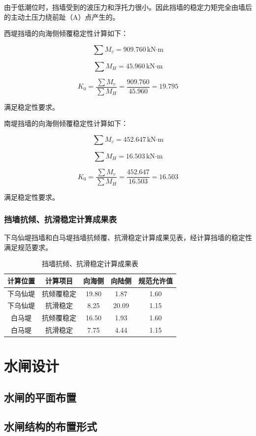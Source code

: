 \documentclass[UTF8, a4paper, 12pt]{ctexart} %
\begin{document}
由于低潮位时，挡墙受到的波压力和浮托力很小。因此挡墙的稳定力矩完全由墙后的主动土压力绕前趾（A）点产生的。

西堤挡墙的向海侧倾覆稳定性计算如下：

\[
\sum M_v = 909.760\,\text{kN·m}
\]

\[
\sum M_H = 45.960\,\text{kN·m}
\]

\[
K_0 = \frac{\sum M_v}{\sum M_H} = \frac{909.760}{45.960} = 19.795
\]

满足稳定性要求。

南堤挡墙的向海侧倾覆稳定性计算如下：

\[
\sum M_v = 452.647\,\text{kN·m}
\]

\[
\sum M_H = 16.503\,\text{kN·m}
\]

\[
K_0 = \frac{\sum M_v}{\sum M_H} = \frac{452.647}{16.503} = 16.503
\]

满足稳定性要求。
\subsubsection{挡墙抗倾、抗滑稳定计算成果表}
下乌仙堤挡墙和白马堤挡墙抗倾覆、抗滑稳定计算成果见表，经计算挡墙的稳定性满足规范要求。

\begin{table}[h]
    \centering
    \caption{挡墙抗倾、抗滑稳定计算成果表}
    \begin{tabular}{|c|c|c|c|c|}
        \hline
        \textbf{计算位置} & \textbf{计算项目} & \textbf{向海侧} & \textbf{向陆侧} & \textbf{规范允许值} \\ \hline
        下乌仙堤 & 抗倾覆稳定 & 19.80 & 1.87 & 1.60 \\ \hline
        下乌仙堤 & 抗滑稳定 & 8.25 & 20.09 & 1.15 \\ \hline
        白马堤 & 抗倾覆稳定 & 16.50 & 1.93 & 1.60 \\ \hline
        白马堤 & 抗滑稳定 & 7.75 & 4.44 & 1.15 \\ \hline
    \end{tabular}
    \label{tab:stability_results}
\end{table}
\section{水闸设计}
\subsection{水闸的平面布置}
\subsection{水闸结构的布置形式}
\end{document}
